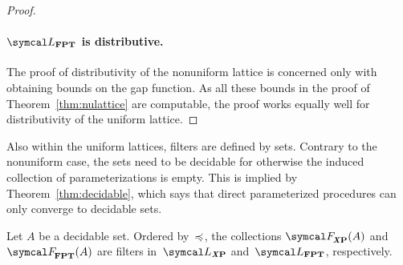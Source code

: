 \begin{proof}
  \paragraph{$\calL_\cl{FPT}$ is distributive.}
  The proof of distributivity of the nonuniform lattice is concerned only with obtaining bounds on the gap function.
  As all these bounds in the proof of Theorem~\ref{thm:nulattice} are computable, the proof works equally well for distributivity of the uniform lattice.
\end{proof}

Also within the uniform lattices, filters are defined by sets.
Contrary to the nonuniform case, the sets need to be decidable for otherwise the induced collection of parameterizations is empty.
This is implied by Theorem~\ref{thm:decidable}, which says that direct parameterized procedures can only converge to decidable sets.
\begin{theorem}
\label{thm:filter}%
  Let $A$ be a decidable set.
  Ordered by~$\preccurlyeq$, the collections $\calF_\clX{P}(A)$ and $\calF_\cl{FPT}(A)$ are filters in~$\calL_\clX{P}$ and~$\calL_\cl{FPT}$, respectively.
\end{theorem}
